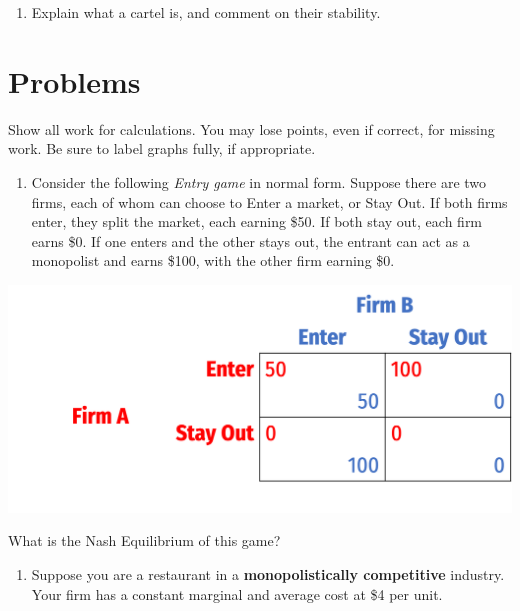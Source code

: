 \documentclass[
  11pt,
]{article}
\providecommand{\tightlist}{%
  \setlength{\itemsep}{0pt}\setlength{\parskip}{0pt}}
\begin{document}
\begin{enumerate}
\def\labelenumi{\arabic{enumi}.}
\setcounter{enumi}{4}
\tightlist
\item
  Explain what a cartel is, and comment on their stability.
\end{enumerate}

\clearpage

\hypertarget{problems}{%
\section{Problems}\label{problems}}

Show all work for calculations. You may lose points, even if correct,
for missing work. Be sure to label graphs fully, if appropriate.

\begin{enumerate}
\def\labelenumi{\arabic{enumi}.}
\setcounter{enumi}{5}
\tightlist
\item
  Consider the following \emph{Entry game} in normal form. Suppose there
  are two firms, each of whom can choose to Enter a market, or Stay Out.
  If both firms enter, they split the market, each earning \$50. If both
  stay out, each firm earns \$0. If one enters and the other stays out,
  the entrant can act as a monopolist and earns \$100, with the other
  firm earning \$0.
\end{enumerate}

\includegraphics{../images/entrygame1.png}

What is the Nash Equilibrium of this game?

\clearpage

\begin{enumerate}
\def\labelenumi{\arabic{enumi}.}
\setcounter{enumi}{6}
\tightlist
\item
  Suppose you are a restaurant in a \textbf{monopolistically
  competitive} industry. Your firm has a constant marginal and average
  cost at \$4 per unit.
\end{enumerate}
\end{document}
